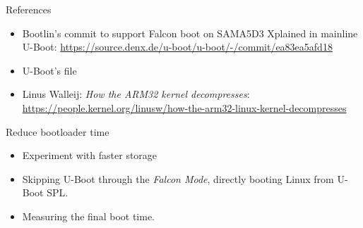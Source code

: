 \begin{frame}{References}
   \begin{itemize}
      \item Bootlin's commit to support Falcon boot on SAMA5D3 Xplained in mainline U-Boot:
            {\small \url{https://source.denx.de/u-boot/u-boot/-/commit/ea83ea5afd18}}
      \item U-Boot's  file
      \item Linus Walleij: {\em How the ARM32 kernel decompresses}:\\
            \small\url{https://people.kernel.org/linusw/how-the-arm32-linux-kernel-decompresses}
   \end{itemize}
\end{frame}

\setuplabframe
{Reduce bootloader time}
{
\begin{itemize}
\item Experiment with faster storage
\item Skipping U-Boot through the {\em Falcon Mode}, directly booting
      Linux from U-Boot SPL.
\item Measuring the final boot time.
\end{itemize}
}

